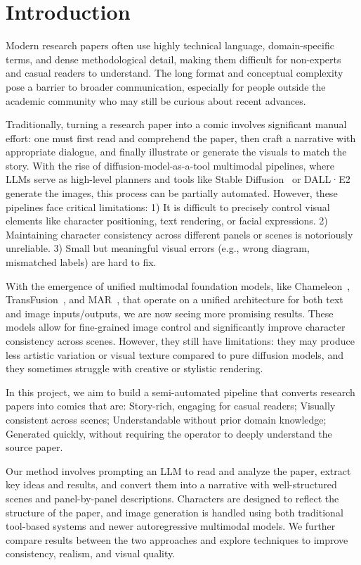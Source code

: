\section{Introduction}\label{sec:introduction}


Modern research papers often use highly technical language, domain-specific terms,
and dense methodological detail, making them difficult for non-experts and casual readers to understand.
The long format and conceptual complexity pose a barrier to broader communication,
especially for people outside the academic community who may still be curious about recent advances.

Traditionally, turning a research paper into a comic involves significant manual effort:
one must first read and comprehend the paper, then craft a narrative with appropriate dialogue,
and finally illustrate or generate the visuals to match the story.
With the rise of diffusion-model-as-a-tool multimodal pipelines, where LLMs serve as high-level planners and tools like
Stable Diffusion~\cite{rombach2022high} or DALL·E2~\cite{ramesh2021zero} generate the images,
this process can be partially automated.
However, these pipelines face critical limitations:
1) It is difficult to precisely control visual elements like character positioning, text rendering, or facial expressions.
2) Maintaining character consistency across different panels or scenes is notoriously unreliable.
3) Small but meaningful visual errors (e.g., wrong diagram, mismatched labels) are hard to fix.

With the emergence of unified multimodal foundation models,
like Chameleon~\cite{team2024chameleon}, TransFusion~\cite{zhou2024transfusion}, and MAR~\cite{li2024autoregressive},
that operate on a unified architecture for both text and image inputs/outputs, we are now seeing more promising results.
These models allow for fine-grained image control and significantly improve character consistency across scenes.
However, they still have limitations: they may produce less artistic variation or visual texture
compared to pure diffusion models, and they sometimes struggle with creative or stylistic rendering.

In this project, we aim to build a semi-automated pipeline that converts research papers into comics that are:
Story-rich, engaging for casual readers;
Visually consistent across scenes;
Understandable without prior domain knowledge;
Generated quickly, without requiring the operator to deeply understand the source paper.

Our method involves prompting an LLM to read and analyze the paper, extract key ideas and results,
and convert them into a narrative with well-structured scenes and panel-by-panel descriptions.
Characters are designed to reflect the structure of the paper,
and image generation is handled using both traditional tool-based systems and newer autoregressive multimodal models.
We further compare results between the two approaches and explore techniques to improve consistency, realism, and visual quality.


